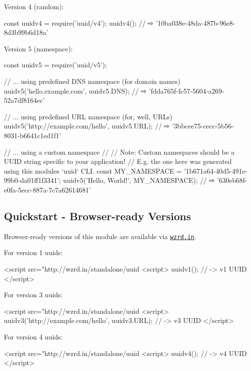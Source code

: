 Version 4 (random)\+:


\begin{DoxyCode}
const uuidv4 = require('uuid/v4');
uuidv4(); // ⇨ '10ba038e-48da-487b-96e8-8d3b99b6d18a'
\end{DoxyCode}


Version 5 (namespace)\+:


\begin{DoxyCode}
const uuidv5 = require('uuid/v5');

// ... using predefined DNS namespace (for domain names)
uuidv5('hello.example.com', uuidv5.DNS); // ⇨ 'fdda765f-fc57-5604-a269-52a7df8164ec'

// ... using predefined URL namespace (for, well, URLs)
uuidv5('http://example.com/hello', uuidv5.URL); // ⇨ '3bbcee75-cecc-5b56-8031-b6641c1ed1f1'

// ... using a custom namespace
//
// Note: Custom namespaces should be a UUID string specific to your application!
// E.g. the one here was generated using this modules `uuid` CLI.
const MY\_NAMESPACE = '1b671a64-40d5-491e-99b0-da01ff1f3341';
uuidv5('Hello, World!', MY\_NAMESPACE); // ⇨ '630eb68f-e0fa-5ecc-887a-7c7a62614681'
\end{DoxyCode}


\subsection*{Quickstart -\/ Browser-\/ready Versions}

Browser-\/ready versions of this module are available via \href{https://github.com/jfhbrook/wzrd.in}{\tt wzrd.\+in}.

For version 1 uuids\+:


\begin{DoxyCode}
<script src="http://wzrd.in/standalone/uuid%
<script>
uuidv1(); // -> v1 UUID
</script>
\end{DoxyCode}


For version 3 uuids\+:


\begin{DoxyCode}
<script src="http://wzrd.in/standalone/uuid%
<script>
uuidv3('http://example.com/hello', uuidv3.URL); // -> v3 UUID
</script>
\end{DoxyCode}


For version 4 uuids\+:


\begin{DoxyCode}
<script src="http://wzrd.in/standalone/uuid%
<script>
uuidv4(); // -> v4 UUID
</script>
\end{DoxyCode}



